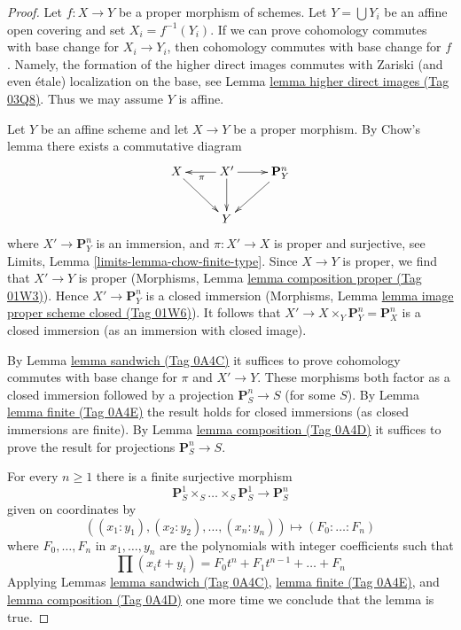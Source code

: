 \documentclass{amsart}
\theoremstyle{plain}
\theoremstyle{definition}
\theoremstyle{remark}
\numberwithin{equation}{subsection}
\begin{document}
\begin{proof}
Let $f : X \to Y$ be a proper morphism of schemes.
Let $Y = \bigcup Y_i$ be an affine open covering
and set $X_i = f^{-1}(Y_i)$. If we can prove
cohomology commutes with base change for $X_i \to Y_i$,
then cohomology commutes with base change for $f$.
Namely, the formation of the higher direct images
commutes with Zariski (and even \'etale) localization
on the base, see
Lemma \href{https://stacks.math.columbia.edu/tag/03Q8}{lemma higher direct images (Tag 03Q8)}.
Thus we may assume $Y$ is affine.

\medskip\noindent
Let $Y$ be an affine scheme and let $X \to Y$ be a proper morphism.
By Chow's lemma there exists a commutative diagram
$$
\xymatrix{
X \ar[rd] & X' \ar[d] \ar[l]^\pi \ar[r] & \mathbf{P}^n_Y \ar[dl] \\
& Y &
}
$$
where $X' \to \mathbf{P}^n_Y$ is an immersion, and
$\pi : X' \to X$ is proper and surjective, see
Limits, Lemma \ref{limits-lemma-chow-finite-type}.
Since $X \to Y$ is proper, we find that $X' \to Y$ is proper
(Morphisms, Lemma \href{https://stacks.math.columbia.edu/tag/01W3}{lemma composition proper (Tag 01W3)}).
Hence $X' \to \mathbf{P}^n_Y$ is a closed immersion
(Morphisms, Lemma \href{https://stacks.math.columbia.edu/tag/01W6}{lemma image proper scheme closed (Tag 01W6)}).
It follows that $X' \to X \times_Y \mathbf{P}^n_Y = \mathbf{P}^n_X$
is a closed immersion (as an immersion with closed image).

\medskip\noindent
By Lemma \href{https://stacks.math.columbia.edu/tag/0A4C}{lemma sandwich (Tag 0A4C)}
it suffices to prove cohomology commutes with base change for
$\pi$ and $X' \to Y$. These morphisms both factor as a closed
immersion followed by a projection $\mathbf{P}^n_S \to S$ (for some $S$).
By Lemma \href{https://stacks.math.columbia.edu/tag/0A4E}{lemma finite (Tag 0A4E)} the result holds for closed
immersions (as closed immersions are finite).
By Lemma \href{https://stacks.math.columbia.edu/tag/0A4D}{lemma composition (Tag 0A4D)} it suffices to prove the
result for projections $\mathbf{P}^n_S \to S$.

\medskip\noindent
For every $n \geq 1$ there is a finite surjective morphism
$$
\mathbf{P}^1_S \times_S \ldots \times_S \mathbf{P}^1_S
\longrightarrow
\mathbf{P}^n_S
$$
given on coordinates by
$$
((x_1 : y_1), (x_2 : y_2), \ldots, (x_n : y_n))
\longmapsto
(F_0 : \ldots : F_n)
$$
where $F_0, \ldots, F_n$ in $x_1, \ldots, y_n$
are the polynomials with integer coefficients such that
$$
\prod (x_i t + y_i) = F_0 t^n + F_1 t^{n - 1} + \ldots + F_n
$$
Applying
Lemmas \href{https://stacks.math.columbia.edu/tag/0A4C}{lemma sandwich (Tag 0A4C)}, \href{https://stacks.math.columbia.edu/tag/0A4E}{lemma finite (Tag 0A4E)}, and \href{https://stacks.math.columbia.edu/tag/0A4D}{lemma composition (Tag 0A4D)}
one more time we conclude that the lemma is true.
\end{proof}
\end{document}
